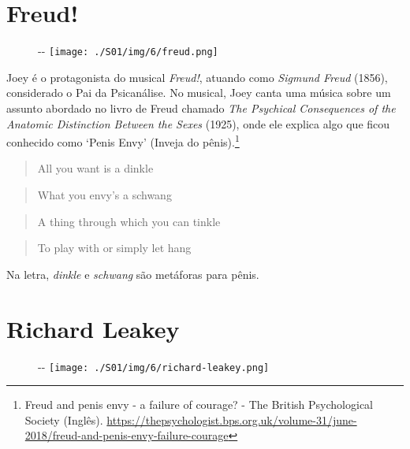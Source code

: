 \hypertarget{freud}{%
\section{Freud!}\label{freud}}

\begin{figure}[!ht]
  \begin{adjustwidth}{-\oddsidemargin-1in}{-\rightmargin}
    \centering
    \texttt{[image: ./S01/img/6/freud.png]}
  \end{adjustwidth}
\end{figure}

Joey é o protagonista do musical \emph{Freud!}, atuando como
\emph{Sigmund Freud} (1856), considerado o Pai da Psicanálise. No
musical, Joey canta uma música sobre um assunto abordado no livro de
Freud chamado \emph{The Psychical Consequences of the Anatomic
Distinction Between the Sexes} (1925), onde ele explica algo que ficou
conhecido como `Penis Envy' (Inveja do pênis).\footnote{\sloppy Freud and penis envy - a failure of courage? - The British Psychological Society (Inglês). \url{https://thepsychologist.bps.org.uk/volume-31/june-2018/freud-and-penis-envy-failure-courage}}

\begin{quote}
All you want is a dinkle
\end{quote}

\begin{quote}
What you envy's a schwang
\end{quote}

\begin{quote}
A thing through which you can tinkle
\end{quote}

\begin{quote}
To play with or simply let hang
\end{quote}

Na letra, \emph{dinkle} e \emph{schwang} são metáforas para pênis.

\hypertarget{richard-leakey}{%
\section{Richard Leakey}\label{richard-leakey}}

\begin{figure}[!ht]
  \begin{adjustwidth}{-\oddsidemargin-1in}{-\rightmargin}
    \centering
    \texttt{[image: ./S01/img/6/richard-leakey.png]}
  \end{adjustwidth}
\end{figure}


